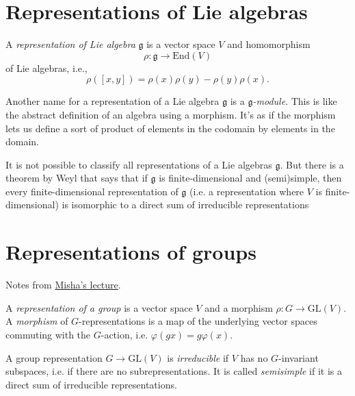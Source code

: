 \section{Representations of Lie algebras}
\label{section-lie-algebra-reps}

\begin{definition}
\label{definition-representation-lie-algebra}
A {\it representation of Lie algebra}
$\mathfrak{g}$ is a vector space $V$
and homomorphism
$$
\rho:\mathfrak{g} \to \text{End}(V)
$$
of Lie algebras, i.e.,
$$
\rho([x,y])=\rho(x)\rho(y)-\rho(y)\rho(x).
$$
\end{definition}

\begin{remark}
\label{remark-representations-are-modules}
Another name for a representation of a Lie
algebra $\mathfrak{g}$ is a
{\it $\mathfrak{g}$-module}. This is like the
abstract definition of an algebra
using a morphism. It's as if the morphism
lets us define a sort of product of
elements in the codomain by elements in the
domain.
\end{remark}

It is not possible to classify all
representations of a Lie algebras
$\mathfrak{g}$. But there is a theorem by
Weyl that says that if $\mathfrak{g}$
is finite-dimensional and (semi)simple, then
every finite-dimensional
representation of $\mathfrak{g}$
(i.e. a representation where $V$ is
finite-dimensional)
is isomorphic to a direct sum of irreducible
representations

\section{Representations of groups}
\label{section-representations-of-groups}

\noindent
Notes from
\href{http://verbit.ru/IMPA/CA-2026/slides-%
CA-2026-05.pdf}{
Misha's lecture}.

\begin{definition}
\label{definition-representation-group}
A {\it representation of a group}
is a vector space $V$ and a morphism
$\rho:G \to \text{GL}(V)$.
A {\it morphism} of $G$-representations
is a map of the underlying vector spaces
commuting
with the $G$-action, i.e.
$\varphi(gx)=g\varphi(x)$.
\end{definition}

\begin{definition}
\label{definition-irreducible-representation}
A group representation $G \to \text{GL}(V)$
is {\it irreducible} if $V$ has no
$G$-invariant subspaces,
i.e. if there are no subrepresentations.
It is called {\it semisimple} if it is a
direct sum
of irreducible representations.
\end{definition}


